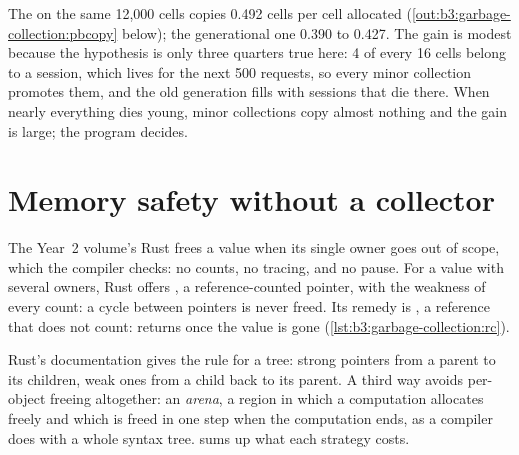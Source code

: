 The  on the same 12,000 cells copies 0.492 cells per cell allocated (\cref{out:b3:garbage-collection:pbcopy} below); the generational one 0.390 to 0.427. The gain is modest because the hypothesis is only three quarters true here: 4 of every 16 cells belong to a session, which lives for the next 500 requests, so every minor collection promotes them, and the old generation fills with sessions that die there. When nearly everything dies young, minor collections copy almost nothing and the gain is large; the program decides.

\section{Memory safety without a collector}\label{sec:b3:garbage-collection:ownership}

The Year~2 volume's Rust frees a value when its single owner goes out of scope, which the compiler checks: no counts, no tracing, and no pause. For a value with several owners, Rust offers , a reference-counted pointer, with the weakness of every count: a cycle between  pointers is never freed. Its remedy is , a reference that does not count:  returns  once the value is gone (\cref{lst:b3:garbage-collection:rc}). %

\label{lst:b3:garbage-collection:rc}

\label{out:b3:garbage-collection:rc}

Rust's documentation gives the rule for a tree: strong pointers from a parent to its children, weak ones from a child back to its parent. A third way avoids per-object freeing altogether: an \emph{arena}, a region in which a computation allocates freely and which is freed in one step when the computation ends, as a compiler does with a whole syntax tree.  sums up what each strategy costs. %

